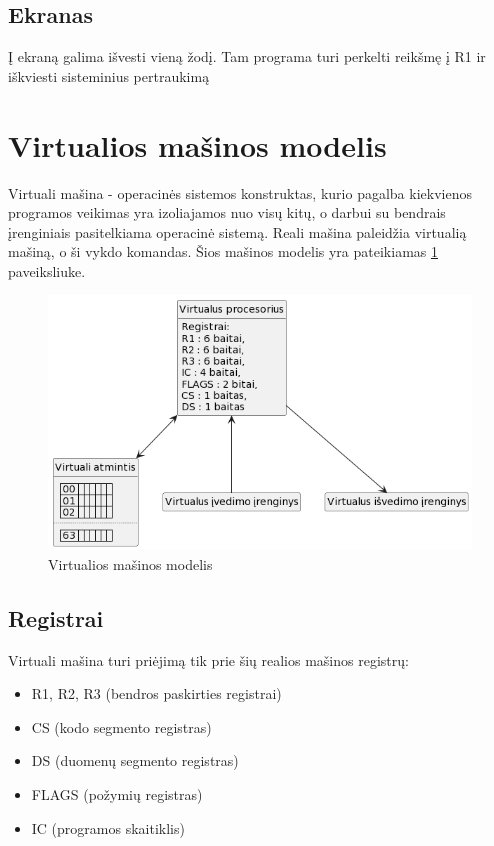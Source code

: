 \documentclass{VUMIFInfKursinis}
\begin{document}
\subsection{Ekranas}

Į ekraną galima išvesti vieną žodį. Tam programa turi perkelti reikšmę į R1 ir iškviesti sisteminius pertraukimą

\section{Virtualios mašinos modelis}

Virtuali mašina - operacinės sistemos konstruktas, kurio pagalba kiekvienos programos veikimas yra izoliajamos nuo visų kitų, o darbui su bendrais įrenginiais pasitelkiama operacinė sistemą. Reali mašina paleidžia virtualią mašiną, o ši vykdo komandas. Šios mašinos modelis yra pateikiamas \ref{img:virtuali_masina} paveiksliuke.

\begin{figure}[H]
	\centering	
	\includegraphics[scale=0.65]{img/virtuali_masina}
	\caption{Virtualios mašinos modelis}   %
	\label{img:virtuali_masina}
\end{figure}

\subsection{Registrai}

Virtuali mašina turi priėjimą tik prie šių realios mašinos registrų:

\begin{itemize}
	\item R1, R2, R3 (bendros paskirties registrai)
	\item CS (kodo segmento registras)
	\item DS (duomenų segmento registras)
	\item FLAGS (požymių registras)
	\item IC (programos skaitiklis)
\end{itemize}
\end{document}

